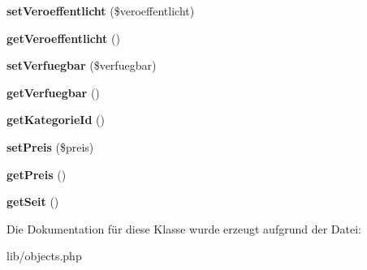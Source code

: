 \begin{DoxyCompactItemize}
\item 
\hypertarget{classArtikel_abc4ddccc3c1597dd8367f733b4537999}{{\bfseries set\-Veroeffentlicht} (\$veroeffentlicht)}\label{classArtikel_abc4ddccc3c1597dd8367f733b4537999}

\item 
\hypertarget{classArtikel_a6e03b9f9bb79ad2b2471b96437c98a6f}{{\bfseries get\-Veroeffentlicht} ()}\label{classArtikel_a6e03b9f9bb79ad2b2471b96437c98a6f}

\item 
\hypertarget{classArtikel_abb6b0283547bb07656d5809ee577bdce}{{\bfseries set\-Verfuegbar} (\$verfuegbar)}\label{classArtikel_abb6b0283547bb07656d5809ee577bdce}

\item 
\hypertarget{classArtikel_a45b627212caa13e05484d74fe02479dc}{{\bfseries get\-Verfuegbar} ()}\label{classArtikel_a45b627212caa13e05484d74fe02479dc}

\item 
\hypertarget{classArtikel_aae722ab125e420f3852cdb77c6bb163c}{{\bfseries get\-Kategorie\-Id} ()}\label{classArtikel_aae722ab125e420f3852cdb77c6bb163c}

\item 
\hypertarget{classArtikel_a2dcaa914ee5faa9d43c1ecd528cdfa6e}{{\bfseries set\-Preis} (\$preis)}\label{classArtikel_a2dcaa914ee5faa9d43c1ecd528cdfa6e}

\item 
\hypertarget{classArtikel_ae169c639a0a5be1ad87eb893949fea11}{{\bfseries get\-Preis} ()}\label{classArtikel_ae169c639a0a5be1ad87eb893949fea11}

\item 
\hypertarget{classArtikel_aa80094f9ad33453c4506eb6f71fa43f8}{{\bfseries get\-Seit} ()}\label{classArtikel_aa80094f9ad33453c4506eb6f71fa43f8}

\end{DoxyCompactItemize}


\-Die \-Dokumentation für diese \-Klasse wurde erzeugt aufgrund der \-Datei\-:\begin{DoxyCompactItemize}
\item 
lib/objects.\-php\end{DoxyCompactItemize}

